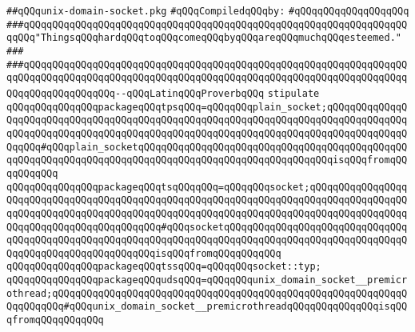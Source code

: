 \label{src/lib/std/src/socket/unix-domain-socket.pkg}
\verb|##qQQqunix-domain-socket.pkg|\newline
\newline
\verb|#qQQqCompiledqQQqby:|\newline
\verb|#qQQqqQQqqQQqqQQqqQQq|\newline
\newline
\newline
\newline
\verb|###qQQqqQQqqQQqqQQqqQQqqQQqqQQqqQQqqQQqqQQqqQQqqQQqqQQqqQQqqQQqqQQqqQQqqQQq"ThingsqQQqhardqQQqtoqQQqcomeqQQqbyqQQqareqQQqmuchqQQqesteemed."|\newline
\verb|###|\newline
\verb|###qQQqqQQqqQQqqQQqqQQqqQQqqQQqqQQqqQQqqQQqqQQqqQQqqQQqqQQqqQQqqQQqqQQqqQQqqQQqqQQqqQQqqQQqqQQqqQQqqQQqqQQqqQQqqQQqqQQqqQQqqQQqqQQqqQQqqQQqqQQqqQQqqQQqqQQqqQQq--qQQqLatinqQQqProverbqQQq|\newline
\newline
\newline
\verb|stipulate|\newline
\verb|qQQqqQQqqQQqqQQqpackageqQQqtpsqQQq=qQQqqQQqplain_socket;qQQqqQQqqQQqqQQqqQQqqQQqqQQqqQQqqQQqqQQqqQQqqQQqqQQqqQQqqQQqqQQqqQQqqQQqqQQqqQQqqQQqqQQqqQQqqQQqqQQqqQQqqQQqqQQqqQQqqQQqqQQqqQQqqQQqqQQqqQQqqQQqqQQqqQQqqQQqqQQq#qQQqplain_socketqQQqqQQqqQQqqQQqqQQqqQQqqQQqqQQqqQQqqQQqqQQqqQQqqQQqqQQqqQQqqQQqqQQqqQQqqQQqqQQqqQQqqQQqqQQqqQQqqQQqqQQqisqQQqfromqQQqqQQqqQQq|\newline
\verb|qQQqqQQqqQQqqQQqpackageqQQqtsqQQqqQQq=qQQqqQQqsocket;qQQqqQQqqQQqqQQqqQQqqQQqqQQqqQQqqQQqqQQqqQQqqQQqqQQqqQQqqQQqqQQqqQQqqQQqqQQqqQQqqQQqqQQqqQQqqQQqqQQqqQQqqQQqqQQqqQQqqQQqqQQqqQQqqQQqqQQqqQQqqQQqqQQqqQQqqQQqqQQqqQQqqQQqqQQqqQQqqQQqqQQq#qQQqsocketqQQqqQQqqQQqqQQqqQQqqQQqqQQqqQQqqQQqqQQqqQQqqQQqqQQqqQQqqQQqqQQqqQQqqQQqqQQqqQQqqQQqqQQqqQQqqQQqqQQqqQQqqQQqqQQqqQQqqQQqqQQqqQQqisqQQqfromqQQqqQQqqQQq|\newline
\verb|qQQqqQQqqQQqqQQqpackageqQQqtssqQQq=qQQqqQQqsocket::typ;|\newline
\verb|qQQqqQQqqQQqqQQqpackageqQQqudsqQQq=qQQqqQQqunix_domain_socket__premicrothread;qQQqqQQqqQQqqQQqqQQqqQQqqQQqqQQqqQQqqQQqqQQqqQQqqQQqqQQqqQQqqQQqqQQqqQQq#qQQqunix_domain_socket__premicrothreadqQQqqQQqqQQqqQQqisqQQqfromqQQqqQQqqQQq|\newline
